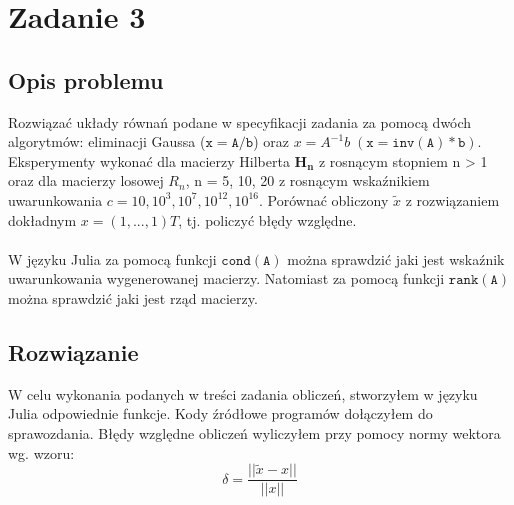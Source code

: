 \section{Zadanie 3}
\subsection{Opis problemu}
Rozwiązać układy równań podane w specyfikacji zadania za pomocą dwóch algorytmów: eliminacji Gaussa ($ \mathtt{x=A/b} $) oraz $ x = A^{-1}b\; (\mathtt{x=inv(A)*b}) $. Eksperymenty wykonać dla macierzy Hilberta $\mathbf{H_n}$ z rosnącym stopniem n > 1 oraz dla macierzy losowej $R_n$, n = 5, 10, 20 z rosnącym wskaźnikiem uwarunkowania $ c = 10, 10^3, 10^7, 10^{12}, 10^{16} $. Porównać obliczony $\tilde{x}$ z rozwiązaniem dokładnym $ x = (1, . . . , 1)T $, tj. policzyć błędy względne. \\ \\
W języku Julia za pomocą funkcji $ \mathtt{cond(A)} $ można sprawdzić jaki jest wskaźnik uwarunkowania wygenerowanej macierzy. Natomiast za pomocą funkcji $ \mathtt{rank(A)} $ można sprawdzić jaki jest rząd macierzy.
\subsection{Rozwiązanie}
W celu wykonania podanych w treści zadania obliczeń, stworzyłem w języku Julia odpowiednie funkcje. Kody źródłowe programów dołączyłem do sprawozdania. Błędy względne obliczeń wyliczyłem przy pomocy normy wektora wg. wzoru:
$$ \delta = \frac{|| \widetilde{x} - x ||}{||x||} $$
